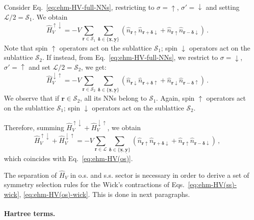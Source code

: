 \begin{tabproof}

	Consider Eq.~\eqref{eq:ehm-HV-full-NNs}, restricting to $\sigma=\uparrow$, $\sigma'=\downarrow$ and setting $\mathcal{L}/2 = \mathcal{S}_1$. We obtain
	\[
		\hat H_V^{\uparrow\downarrow} = - V 
		\sum_{\mathbf{r}\in\mathcal{S}_1} \sum_{\bm{\delta}\in \lbrace \underline{\mathbf{x}}, \underline{\mathbf{y}} \rbrace} \left(\hat n_{\mathbf{r}\uparrow} \hat n_{\mathbf{r}+\bm{\delta}\downarrow} + \hat n_{\mathbf{r}\uparrow} \hat n_{\mathbf{r}-\bm{\delta}\downarrow}\right) \, .
	\]
	Note that spin $\uparrow$ operators act on the sublattice $\mathcal{S}_1$; spin $\downarrow$ operators act on the sublattice $\mathcal{S}_2$. If instead, from Eq.~\eqref{eq:ehm-HV-full-NNs}, we restrict to $\sigma=\downarrow$, $\sigma'=\uparrow$ and set $\mathcal{L}/2 = \mathcal{S}_2$, we get:
	\[
		\hat H_V^{\downarrow\uparrow} = - V 
		\sum_{\mathbf{r}\in\mathcal{S}_2} \sum_{\bm{\delta}\in \lbrace \underline{\mathbf{x}}, \underline{\mathbf{y}} \rbrace} \left(\hat n_{\mathbf{r}\downarrow} \hat n_{\mathbf{r}+\bm{\delta}\uparrow} + \hat n_{\mathbf{r}\downarrow} \hat n_{\mathbf{r}-\bm{\delta}\uparrow}\right) \, .
	\]
	We observe that if $\mathbf{r}\in\mathcal{S}_2$, all its NNs belong to $\mathcal{S}_1$. Again, spin $\uparrow$ operators act on the sublattice $\mathcal{S}_1$; spin $\downarrow$ operators act on the sublattice $\mathcal{S}_2$.
	
	Therefore, summing $\hat H_V^{\uparrow\downarrow} + \hat H_V^{\downarrow\uparrow}$, we obtain
	\[
		\hat H_V^{\uparrow\downarrow} + \hat H_V^{\downarrow\uparrow} = - V 
		\sum_{\mathbf{r}\in\mathcal{L}} \sum_{\bm{\delta}\in \lbrace \underline{\mathbf{x}}, \underline{\mathbf{y}} \rbrace} \left(\hat n_{\mathbf{r}\uparrow} \hat n_{\mathbf{r}+\bm{\delta}\downarrow} + \hat n_{\mathbf{r}\uparrow} \hat n_{\mathbf{r}-\bm{\delta}\downarrow}\right) \, ,
	\]
	which coincides with Eq.~\eqref{eq:ehm-HV(os)}.
	
\end{tabproof}

The separation of $\hat H_V$ in o.s. and s.s. sector is necessary in order to derive a set of symmetry selection rules for the Wick's contractions of Eqs.~\eqref{eq:ehm-HV(ss)-wick}, \eqref{eq:ehm-HV(os)-wick}. This is done in next paragraphs.

\paragraph{Hartree terms.}

